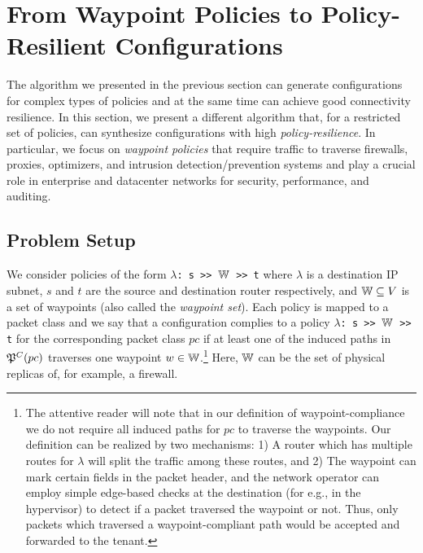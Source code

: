 \section{From Waypoint Policies to Policy-Resilient Configurations}
\label{sec:waypointres}


The algorithm we presented in the previous section can generate configurations
for complex types of policies and at the same time can achieve good
connectivity resilience.
In this section, we present a different algorithm that, for a restricted set of policies,
can synthesize configurations with high \emph{policy-resilience}.
In particular, we focus on \emph{waypoint policies}
that require traffic to traverse
firewalls,
proxies, optimizers, and intrusion detection/prevention 
systems and
play a crucial role in enterprise and
datacenter networks for security, performance,  
and auditing.

\subsection{Problem Setup}

We consider policies of the form 
\texttt{$\lambda$: s >> $\mathbb{W}$ >> t}
where $\lambda$ is a destination IP subnet,  
$s$ and $t$ are the source and destination router respectively, 
and $\mathbb{W} \subseteq V$ is a set of waypoints (also called the \emph{waypoint set}). 
Each policy is mapped to a packet class and
we say that a configuration complies to a policy 
\texttt{$\lambda$: s >> $\mathbb{W}$ >> t}
 for the corresponding packet class
$pc$ if
at least one of the induced paths in $\mathfrak{P}^C(pc)$ 
traverses one waypoint $w \in \mathbb{W}$.\footnote{
The attentive reader will note that in our definition of waypoint-compliance 
we do not require all induced paths for $pc$ to traverse the waypoints. 
Our 
definition can be realized by two mechanisms: 1) A router
which has multiple routes for $\lambda$ will split the traffic
among these routes, and 2) The waypoint can mark certain fields in
the packet header, and the network operator can employ 
simple edge-based checks at the destination 
(for e.g., in the hypervisor) to 
detect if a packet traversed the waypoint or not. Thus, only
packets which traversed a waypoint-compliant path would be 
accepted and forwarded to the tenant. 
}
Here, $\mathbb{W}$
can be the set of physical replicas of,  for example, a firewall.


